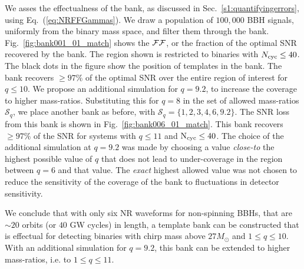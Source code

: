 
We asses the effectualness of the bank, as discussed in 
Sec.~\ref{s1:quantifyingerrors}, using Eq.~(\ref{eq:NRFFGammas}).
We draw a population of $100,000$ BBH signals, uniformly from the binary 
mass space, and filter them through the bank. Fig.~\ref{fig:bank001_01_match}
shows the $\mathcal{FF}$, or the fraction of the optimal SNR recovered by the bank. 
The region shown is restricted to binaries with $N_{\mathrm{cyc}}\leq 40$.
The black dots in the figure show the position of templates in the bank. 
The bank recovers $\geq 97\%$ of the optimal SNR over the entire region 
of interest for $q\leq 10$. We 
propose an additional simulation for $q=9.2$, to increase the coverage to
higher mass-ratios. Substituting this for $q=8$ in the set of allowed 
mass-ratios $\mathcal{S}_q$, we place another bank as before, with
$\mathcal{S}_q=\{1,2,3,4,6,9.2\}$. The SNR loss from this bank is shown in
Fig.~\ref{fig:bank006_01_match}. This bank recovers $\geq 97\%$ of the SNR for
systems with $q\leq 11$ and $\mathrm{N}_{\mathrm{cyc}}\leq 40$. The choice of the additional
simulation at $q=9.2$ was made by choosing a value \textit{close-to} the 
highest possible value of $q$ that does not lead to under-coverage in the 
region between $q=6$ and that value. The \textit{exact} highest allowed 
value was not chosen to reduce the sensitivity of the coverage of the bank
to fluctuations in detector sensitivity.

We conclude that with only six NR waveforms for non-spinning BBHs, that are
$\sim 20$ orbits (or $40$ GW cycles) in length, a template bank can be
constructed that is effectual for detecting binaries with chirp mass above
$27M_\odot$ and $1\leq q\leq 10$. With an additional 
simulation for $q=9.2$, this bank can 
be extended to higher mass-ratios, i.e. to $1\leq q\leq 11$.


